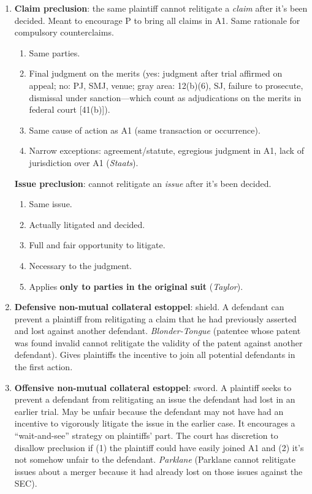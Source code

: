 \begin{enumerate}
    \item \textbf{Claim preclusion}: the same plaintiff cannot relitigate a 
    \emph{claim} after it's been decided. Meant to encourage P to bring all 
    claims in A1. Same rationale for compulsory counterclaims.
    \begin{enumerate}
        \item Same parties.
        \item Final judgment on the merits (yes: judgment after trial affirmed 
        on appeal; no: PJ, SMJ, venue; gray area: 12(b)(6), SJ, failure to 
        prosecute, dismissal under sanction---which count as adjudications on 
        the merits in federal court [41(b)]).
        \item Same cause of action as A1 (same transaction or occurrence).
        \item Narrow exceptions: agreement/statute, egregious judgment in A1, 
        lack of jurisdiction over A1 (\emph{Staats}).        \end{enumerate}
    \textbf{Issue preclusion}: cannot relitigate an \emph{issue} after it's 
    been decided.
    \begin{enumerate}
        \item Same issue.
        \item Actually litigated and decided.
        \item Full and fair opportunity to litigate.
        \item Necessary to the judgment.
        \item Applies \textbf{only to parties in the original suit} 
        (\emph{Taylor}).
    \end{enumerate}
    \item \textbf{Defensive non-mutual collateral estoppel}: shield. A 
    defendant can prevent a plaintiff from relitigating a claim that he had 
    previously asserted and lost against another defendant.  
    \emph{Blonder-Tongue} (patentee whose patent was found invalid cannot 
    relitigate the validity of the patent against another defendant). Gives 
    plaintiffs the incentive to join all potential defendants in the first 
    action.
    \item \textbf{Offensive non-mutual collateral estoppel}: sword. A 
    plaintiff seeks to prevent a defendant from relitigating an issue the 
    defendant had lost in an earlier trial. May be unfair because the 
    defendant may not have had an incentive to vigorously litigate the issue 
    in the earlier case. It encourages a ``wait-and-see'' strategy on 
    plaintiffs' part. The court has discretion to disallow preclusion if (1) 
    the plaintiff could have easily joined A1 and (2) it's not somehow unfair 
    to the defendant. \emph{Parklane} (Parklane cannot relitigate issues about 
    a merger because it had already lost on those issues against the SEC).  
    \end{enumerate}

